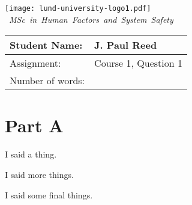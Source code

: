 \documentclass[12pt,letterpaper]{article}
\begin{document}
\vbox{
\hspace*{-0.75cm}\texttt{[image: lund-university-logo1.pdf]}
\bigskip
\newline
\hbox{%
%
\textit{MSc in Human Factors and System Safety}
}
}
\bigskip

\begin{tabular}{| l | >{\noindent\arraybackslash}p{8cm} |}
\hline
Student Name:    & J. Paul Reed \\
\hline
Assignment:      & Course 1, Question 1 \\
\hline
Number of words: & 1519 \\
\hline
\end{tabular}
\section*{Part A}
\begin{linenumbers}
\vspace{\baselineskip}
I said a thing.
\par
\medskip
I said more things.
\par
\medskip
I said some final things.
\end{linenumbers}
\par
\bigskip

\printbibliography[title={Reference List:}]
\end{document}
